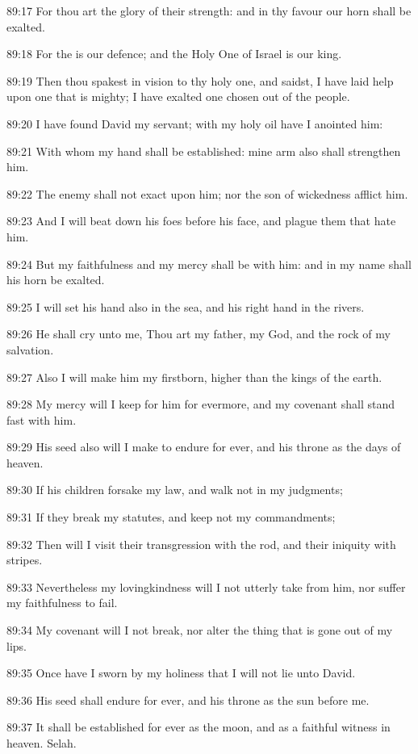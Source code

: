 89:17 For thou art the glory of their strength: and in thy favour our
horn shall be exalted.

89:18 For the \LORD is our defence; and the Holy One of Israel is our
king.

89:19 Then thou spakest in vision to thy holy one, and saidst, I have
laid help upon one that is mighty; I have exalted one chosen out of
the people.

89:20 I have found David my servant; with my holy oil have I anointed
him:

89:21 With whom my hand shall be established: mine arm also shall
strengthen him.

89:22 The enemy shall not exact upon him; nor the son of wickedness
afflict him.

89:23 And I will beat down his foes before his face, and plague them
that hate him.

89:24 But my faithfulness and my mercy shall be with him: and in my
name shall his horn be exalted.

89:25 I will set his hand also in the sea, and his right hand in the
rivers.

89:26 He shall cry unto me, Thou art my father, my God, and the rock
of my salvation.

89:27 Also I will make him my firstborn, higher than the kings of the
earth.

89:28 My mercy will I keep for him for evermore, and my covenant shall
stand fast with him.

89:29 His seed also will I make to endure for ever, and his throne as
the days of heaven.

89:30 If his children forsake my law, and walk not in my judgments;

89:31 If they break my statutes, and keep not my commandments;

89:32 Then will I visit their transgression with the rod, and their
iniquity with stripes.

89:33 Nevertheless my lovingkindness will I not utterly take from him,
nor suffer my faithfulness to fail.

89:34 My covenant will I not break, nor alter the thing that is gone
out of my lips.

89:35 Once have I sworn by my holiness that I will not lie unto David.

89:36 His seed shall endure for ever, and his throne as the sun before
me.

89:37 It shall be established for ever as the moon, and as a faithful
witness in heaven. Selah.

